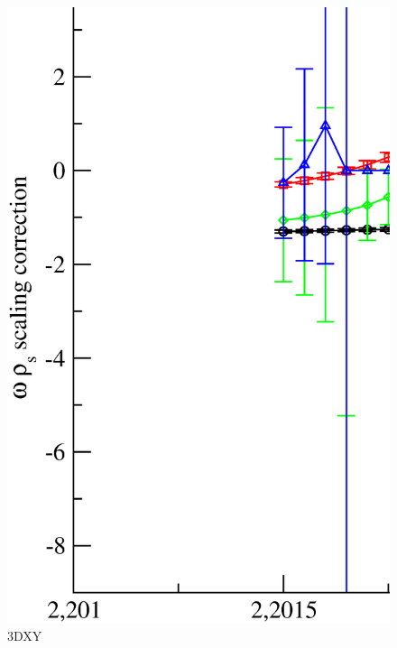\begin{figure}[!htpb]
  \centering
  \includegraphics[width=15cm]{./plots/3DXY/3DXY_omega_from_rs_vs_Temperature.eps}
  \caption{3DXY}
\end{figure}

